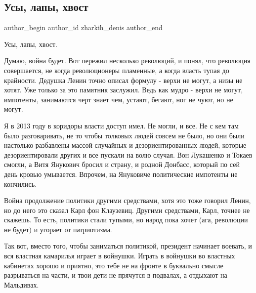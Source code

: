  
 
 
 
 
 
\subsection{Усы, лапы, хвост}
\label{sec:16_01_2022.fb.zharkih_denis.1.usy_lapy_hvost}
 
\ifcmt
 author_begin
   author_id zharkih_denis
 author_end
\fi

Усы, лапы, хвост. 

Думаю, война будет. Вот пережил несколько революций, и понял, что революция
совершается, не когда революционеры пламенные, а когда власть тупая до
крайности. Дедушка Ленин точно описал формулу - верхи не могут, а низы не
хотят. Уже только за это памятник заслужил. Ведь как мудро - верхи не могут,
импотенты, занимаются черт знает чем, устают, бегают, ног не чуют, но не могут. 

Я в 2013 году в коридоры власти доступ имел. Не могли, и все. Не с кем там было
разговаривать, не то чтобы толковых людей совсем не было, но они были настолько
разбавлены массой случайных и дезориентированных людей, которые
дезориентировали других и все пускали на волю случая.  Вон Лукашенко и Токаев
смогли, а Витя Янукович бросил и страну, и родной Донбасс, который по сей день
кровью умывается. Впрочем, на Януковиче политические импотенты не кончились. 

Война продолжение политики другими средствами, хотя это тоже говорил Ленин, но
до него это сказал Карл фон Клаузевиц. Другими средствами, Карл, точнее не
скажешь. То есть, политики стали тупыми, но народ пока хочет (ага, революции не
будет) и угорает от патриотизма. 

Так вот, вместо того, чтобы заниматься политикой, президент начинает воевать, и
вся властная камарилья играет в войнушки. Играть в войнушки во властных
кабинетах хорошо и приятно, это тебе не на фронте в буквально смысле
разрываться на части, и твои дети не прячутся в подвалах, а отдыхают на
Мальдивах. 

